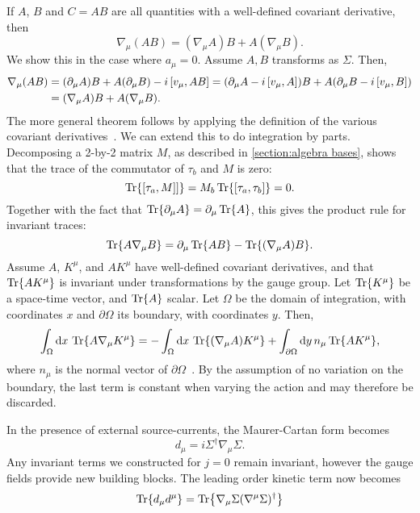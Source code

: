 If $A$, $B$ and $C = AB$ are all quantities with a well-defined covariant derivative, then
\begin{equation}
    \nabla_\mu (AB) = (\nabla_\mu A) B + A (\nabla_\mu B).
\end{equation}
We show this in the case where $a_\mu = 0$.
Assume $A, B$ transforms as $\Sigma$. 
Then,
\begin{align*}
    \nabla_\mu (A B)
    & = (\partial_\mu A) B + A (\partial_\mu B) - i \left[v_\mu, AB \right]
    = (\partial_\mu A - i \left[v_\mu, A \right])B + A(\partial_\mu B- i \left[v_\mu, B \right])\\
    & = (\nabla_\mu A)B + A (\nabla_\mu B).
\end{align*}
The more general theorem follows by applying the definition of the various covariant derivatives~\cite{Scherer:PhysRevD.53.315}.
We can extend this to do integration by parts.
Decomposing a 2-by-2 matrix $M$, as described in \autoref{section:algebra bases}, shows that the trace of the commutator of $\tau_b$ and $M$ is zero:
\begin{equation*}
    \Tr{\left[\tau_a, M \right]]} = M_b\Tr{ \left[\tau_a, \tau_b \right]} = 0.
\end{equation*}
Together with the fact that $\Tr{\partial_\mu A} = \partial_\mu \Tr{A}$, this gives the product rule for invariant traces:
\begin{equation*}
    \Tr{A \nabla_\mu B} = \partial_\mu \Tr{AB} - \Tr{(\nabla_\mu A) B}.
\end{equation*}
Assume $A$, $K^\mu$, and $A K^\mu$ have well-defined covariant derivatives, and that $\Tr{A K^\mu}$ is invariant under transformations by the gauge group.
Let $\Tr{K^\mu}$ be a space-time vector, and $\Tr{A}$ scalar. 
Let $\Omega$ be the domain of integration, with coordinates $x$ and $\partial \Omega$ its boundary, with coordinates $y$. Then, 
\begin{align*}
    \int_\Omega \dd x \, \Tr{A \nabla_\mu K^\mu} 
    = 
    - \int_\Omega \dd x \, \Tr{(\nabla_\mu A) K^\mu}
    + \int_{\partial\Omega} \dd y\, n_\mu \Tr{A K^\mu},
\end{align*}
where $n_\mu$ is the normal vector of $\partial \Omega$~\cite{Carroll:space-time}.
By the assumption of no variation on the boundary, the last term is constant when varying the action and may therefore be discarded.

In the presence of external source-currents, the Maurer-Cartan form becomes
\begin{equation}
    d_\mu = i \Sigma^\dagger \nabla_\mu \Sigma.
\end{equation}
Any invariant terms we constructed for $j=0$ remain invariant, however the gauge fields provide new building blocks.
The leading order kinetic term now becomes
\begin{equation}
    \label{leading order term sigma}
    \Tr{d_\mu d^\mu} = \Tr{\nabla_\mu \Sigma (\nabla^\mu \Sigma)^\dagger}
\end{equation}

